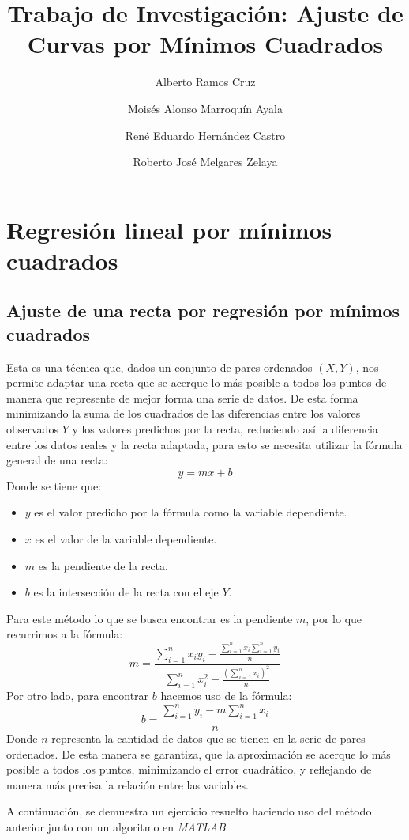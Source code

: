 \documentclass[11pt,letterpaper]{article}
\begin{document}
\title{Trabajo de Investigación: Ajuste de Curvas por Mínimos Cuadrados}

\author{
	Alberto Ramos Cruz
	\and Moisés Alonso Marroquín Ayala
	\and René Eduardo Hernández Castro
	\and Roberto José Melgares Zelaya
}
\maketitle


\section{Regresión lineal por mínimos cuadrados}
\subsection{Ajuste de una recta por regresión por mínimos cuadrados}
Esta es una técnica que, dados un conjunto de pares ordenados $(X,Y)$, nos permite adaptar una recta que se acerque lo más posible a todos los puntos de manera que represente de mejor forma una serie de datos. De esta forma minimizando la suma de los cuadrados de las diferencias entre los valores observados $Y$ y los valores predichos por la recta, reduciendo así la diferencia entre los datos reales y la recta adaptada, para esto se necesita utilizar la fórmula general de una recta: $$ y = mx + b$$
Donde se tiene que: 
\begin{itemize}
	\item $y$ es el valor predicho por la fórmula como la variable dependiente.
	\item $x$ es el valor de la variable dependiente.
	\item $m$ es la pendiente de la recta.
	\item $b$ es la intersección de la recta con el eje $Y$.
\end{itemize}
Para este método lo que se busca encontrar es la pendiente $m$, por lo que recurrimos a la fórmula:
\begin{equation}
m = \frac{\sum_{i=1}^{n} x_iy_i - \frac{\sum_{i=1}^{n} x_i \sum_{i=1}^{n} y_i}{n}}{\sum_{i=1}^{n} x_i^2 - \frac{(\sum_{i=1}^{n} x_i)^2}{n}}
\end{equation}
Por otro lado, para encontrar $b$ hacemos uso de la fórmula:
\begin{equation}
b = \frac{\sum_{i=1}^{n} y_i - m\sum_{i=1}^{n} x_i}{n}
\end{equation}
Donde $n$ representa la cantidad de datos que se tienen en la serie de pares ordenados. De esta manera se garantiza, que la aproximación se acerque lo más posible a todos los puntos, minimizando el error cuadrático, y reflejando de manera más precisa la relación entre las variables.\cite{nieves2011metodos} \par A continuación, se demuestra un ejercicio resuelto haciendo uso del método anterior junto con un algoritmo en \textit{MATLAB}
\end{document}
